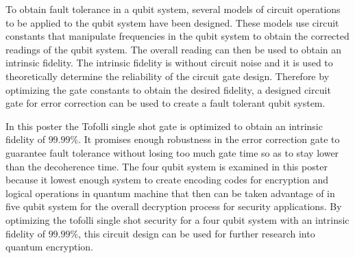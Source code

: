 \documentclass{article}
\begin{document}
To obtain fault tolerance in a qubit system, several models of circuit operations to be applied to the qubit system have been designed. These models use circuit constants that manipulate frequencies in the qubit system to obtain the corrected readings of the qubit system. The overall reading can then be used to obtain an intrinsic fidelity. The intrinsic fidelity is without circuit noise and it is used to theoretically determine the reliability of the circuit gate design. Therefore by optimizing the gate constants to obtain the desired fidelity, a designed circuit gate for error correction can be used to create a fault tolerant qubit system. 

In this poster the Tofolli single shot gate is optimized to obtain an intrinsic fidelity of $99.99\%$. It promises enough robustness in the error correction gate to guarantee fault tolerance without losing too much gate time so as to stay lower than the decoherence time. The four qubit system is examined in this poster because it lowest enough system to create encoding codes for encryption and logical operations in quantum machine that then can be taken advantage of in five qubit system for the overall decryption process for security applications. By optimizing the tofolli single shot security for a four qubit system with an intrinsic fidelity of $99.99\%$, this circuit design can be used for further research into quantum encryption.              
\end{document}
